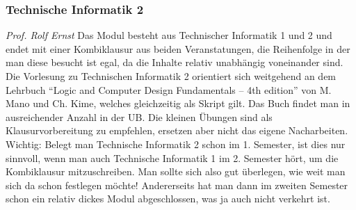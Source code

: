 \begin{multicols}{2}
\subsubsection{Technische Informatik 2}
	\textit{Prof. Rolf Ernst}
	Das Modul besteht aus Technischer Informatik 1 und 2 und endet
	mit einer Kombiklausur aus beiden Veranstatungen, die
	Reihenfolge in der man diese besucht ist egal, da die
	Inhalte relativ unabhängig voneinander sind.
	Die Vorlesung zu Technischen Informatik 2 orientiert sich
	weitgehend an dem Lehrbuch \enquote{Logic and Computer Design
	Fundamentals – 4th edition} von M. Mano und Ch. Kime, welches
	gleichzeitig als Skript gilt. Das Buch findet man in
	ausreichender Anzahl in der UB. Die kleinen Übungen sind als
	Klausurvorbereitung zu empfehlen, ersetzen aber nicht das eigene
	Nacharbeiten. Wichtig: Belegt man Technische Informatik 2 schon
	im 1. Semester, ist dies nur sinnvoll, wenn man auch Technische
	Informatik 1 im 2. Semester hört, um die Kombiklausur
	mitzuschreiben. Man sollte sich also gut überlegen, wie weit man
	sich da schon festlegen möchte! Andererseits hat man dann im
	zweiten Semester schon ein relativ dickes Modul abgeschlossen,
	was ja auch nicht verkehrt ist.

\end{multicols}

